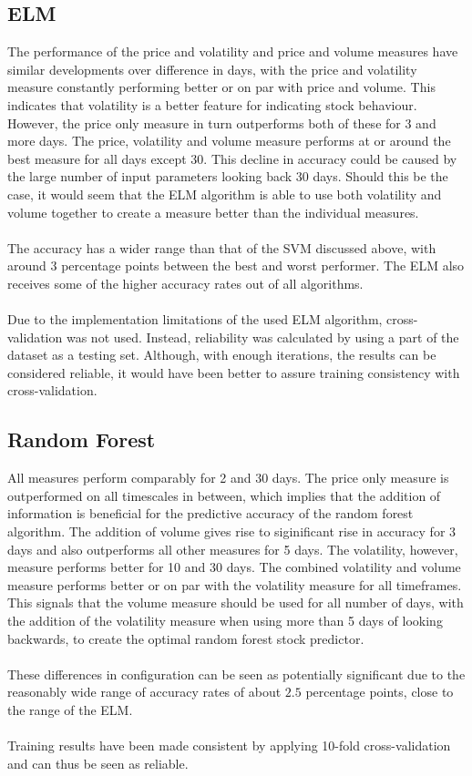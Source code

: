 \documentclass{article}
\begin{document}
\subsection{ELM}
The performance of the price and volatility and price and volume measures have similar developments over difference in days, with the price and volatility measure constantly performing better or on par with price and volume. This indicates that volatility is a better feature for indicating stock behaviour. However, the price only measure in turn outperforms both of these for 3 and more days. The price, volatility and volume measure performs at or around the best measure for all days except 30. This decline in accuracy could be caused by the large number of input parameters looking back 30 days. Should this be the case, it would seem that the ELM algorithm is able to use both volatility and volume together to create a measure better than the individual measures. 
\\ \\
The accuracy has a wider range than that of the SVM discussed above, with around $3$ percentage points between the best and worst performer. The ELM also receives some of the higher accuracy rates out of all algorithms.
\\ \\
Due to the implementation limitations of the used ELM algorithm, cross-validation was not used. Instead, reliability was calculated by using a part of the dataset as a testing set. Although, with enough iterations, the results can be considered reliable, it would have been better to assure training consistency with cross-validation. 

\subsection{Random Forest}
All measures perform comparably for 2 and 30 days. The price only measure is outperformed on all timescales in between, which implies that the addition of information is beneficial for the predictive accuracy of the random forest algorithm. The addition of volume gives rise to siginificant rise in accuracy for 3 days and also outperforms all other measures for 5 days. The volatility, however,  measure performs better for 10 and 30 days. The combined volatility and volume measure performs better or on par with the volatility measure for all timeframes. This signals that the volume measure should be used for all number of days, with the addition of the volatility measure when using more than 5 days of looking backwards, to create the optimal random forest stock predictor.
\\ \\
These differences in configuration can be seen as potentially significant due to the reasonably wide range of accuracy rates of about $2.5$ percentage points, close to the range of the ELM.
\\ \\
Training results have been made consistent by applying 10-fold cross-validation and can thus be seen as reliable.
\end{document}
